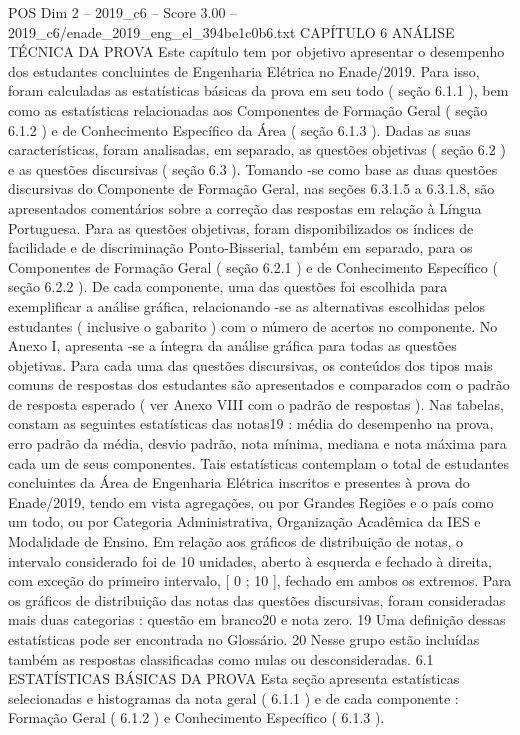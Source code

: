 \begin{textsample}{POS Dim 2 – 2019\_c6 – Score 3.00 – 2019\_c6/enade\_2019\_eng\_el\_394be1c0b6.txt}  \label{ex:f2_pos_156}
CAPÍTULO 6 ANÁLISE TÉCNICA DA PROVA Este capítulo tem por objetivo apresentar o desempenho dos estudantes concluintes de Engenharia Elétrica no Enade/2019.
Para isso, foram calculadas as estatísticas básicas da prova em seu todo ( seção 6.1.1 ), bem como as estatísticas relacionadas aos Componentes de Formação Geral ( seção 6.1.2 ) e de Conhecimento Específico da Área ( seção 6.1.3 ).
Dadas as suas características, foram analisadas, em separado, as questões objetivas ( seção 6.2 ) e as questões discursivas ( seção 6.3 ).
Tomando -se como base as duas questões discursivas do Componente de Formação Geral, nas seções 6.3.1.5 a 6.3.1.8, são apresentados comentários sobre a correção das respostas em relação à Língua Portuguesa.
Para as questões objetivas, foram disponibilizados os índices de facilidade e de discriminação Ponto-Bisserial, também em separado, para os Componentes de Formação Geral ( seção 6.2.1 ) e de Conhecimento Específico ( seção 6.2.2 ).
De cada componente, uma das questões foi escolhida para exemplificar a análise gráfica, relacionando -se as alternativas escolhidas pelos estudantes ( inclusive o gabarito ) com o número de acertos no componente.
No Anexo I, apresenta -se a íntegra da análise gráfica para todas as questões objetivas.
Para cada uma das questões discursivas, os conteúdos dos tipos mais comuns de respostas dos estudantes são apresentados e comparados com o padrão de resposta esperado ( ver Anexo VIII com o padrão de respostas ).
Nas tabelas, constam as seguintes estatísticas das notas19 : média do desempenho na prova, erro padrão da média, desvio padrão, nota mínima, mediana e nota máxima para cada um de seus componentes.
Tais estatísticas contemplam o total de estudantes concluintes da Área de Engenharia Elétrica inscritos e presentes à prova do Enade/2019, tendo em vista agregações, ou por Grandes Regiões e o país como um todo, ou por Categoria Administrativa, Organização Acadêmica da IES e Modalidade de Ensino.
Em relação aos gráficos de distribuição de notas, o intervalo considerado foi de 10 unidades, aberto à esquerda e fechado à direita, com exceção do primeiro intervalo, [ 0 ; 10 ], fechado em ambos os extremos.
Para os gráficos de distribuição das notas das questões discursivas, foram consideradas mais duas categorias : questão em branco20 e nota zero. 19 Uma definição dessas estatísticas pode ser encontrada no Glossário. 20 Nesse grupo estão incluídas também as respostas classificadas como nulas ou desconsideradas. 6.1 ESTATÍSTICAS BÁSICAS DA PROVA Esta seção apresenta estatísticas selecionadas e histogramas da nota geral ( 6.1.1 ) e de cada componente : Formação Geral ( 6.1.2 ) e Conhecimento Específico ( 6.1.3 ).

\end{textsample}
